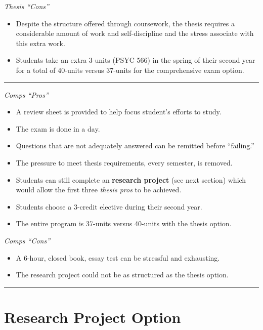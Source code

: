 \documentclass[openany]{book}
\providecommand{\tightlist}{%
  \setlength{\itemsep}{0pt}\setlength{\parskip}{0pt}}
\begin{document}
\emph{Thesis ``Cons''}

\begin{itemize}
\tightlist
\item
  Despite the structure offered through coursework, the thesis requires a considerable amount of work and self-discipline and the stress associate with this extra work.
\item
  Students take an extra 3-units (PSYC 566) in the spring of their second year for a total of 40-units versus 37-units for the comprehensive exam option.
\end{itemize}

\begin{center}\rule{0.5\linewidth}{0.5pt}\end{center}

\emph{Comps ``Pros''}

\begin{itemize}
\tightlist
\item
  A review sheet is provided to help focus student's efforts to study.
\item
  The exam is done in a day.
\item
  Questions that are not adequately answered can be remitted before ``failing.''
\item
  The pressure to meet thesis requirements, every semester, is removed.
\item
  Students can still complete an \textbf{research project} (see next section) which would allow the first three \emph{thesis pros} to be achieved.
\item
  Students choose a 3-credit elective during their second year.
\item
  The entire program is 37-units versus 40-units with the thesis option.
\end{itemize}

\emph{Comps ``Cons''}

\begin{itemize}
\tightlist
\item
  A 6-hour, closed book, essay test can be stressful and exhausting.
\item
  The research project could not be as structured as the thesis option.
\end{itemize}

\begin{center}\rule{0.5\linewidth}{0.5pt}\end{center}

\hypertarget{research-project-option}{%
\section{Research Project Option}\label{research-project-option}}
\end{document}
